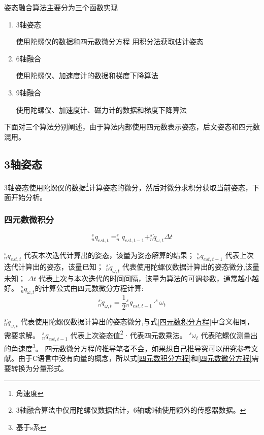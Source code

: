 \documentclass[12pt,a4paper]{article}
\renewcommand{\citet}[1]{\textsuperscript{\cite{#1}}}
\begin{document}
姿态融合算法主要分为三个函数实现
\begin{enumerate}
    \item 3轴姿态

        使用陀螺仪的数据和四元数微分方程 用积分法获取估计姿态
    \item 6轴融合

        使用陀螺仪、加速度计的数据和梯度下降算法
    \item 9轴融合

        使用陀螺仪、加速度计、磁力计的数据和梯度下降算法
\end{enumerate}
下面对三个算法分别阐述，由于算法内部使用四元数表示姿态，后文姿态和四元数混用。

\subsection{3轴姿态}
3轴姿态使用陀螺仪的数据\footnote{角速度}计算姿态的微分，然后对微分求积分获取当前姿态，下面开始分析。
\subsubsection{四元数微积分}
\begin{equation}\label{四元数积分方程}
    ^s_nq_{est,t}=^s_nq_{est,t-1}+^s_n\dot{q}_{\omega,t}\Delta t
\end{equation} 

$^s_nq_{est,t}$          代表本次迭代计算出的姿态，该量为姿态解算的结果；
$^s_nq_{est,t-1}$        代表上次迭代计算出的姿态，该量已知；
$^s_n\dot{q}_{\omega,t}$ 代表使用陀螺仪数据计算出的姿态微分,该量未知；
$\Delta t$               代表上次与本次迭代的时间间隔，该量为算法的可调参数，通常越小越好。
$^s_n\dot{q}_{\omega,t}$的计算公式由四元数微分方程计算:
\begin{equation}\label{四元数微分方程}
    ^s_n\dot{q}_{\omega,t}=\frac{1}{2}{^s_nq_{est,t-1}}\cdot^s\omega_t
\end{equation} 

$^s_n\dot{q}_{\omega,t}$ 代表使用陀螺仪数据计算出的姿态微分,与式\ref{四元数积分方程}中含义相同，需要求解。
$^s_nq_{est,t-1}$  代表上次姿态值\footnote{3轴融合算法中仅用陀螺仪数据估计，6轴或9轴使用额外的传感器数据。}
$\cdot$                  代表四元数乘法。
$^s\omega_t$             代表陀螺仪测量出的角速度\footnote{基于s系}。
四元数微分方程的推导笔者不会，如果想自己推导究可以研究参考文献\citet{四元数微分方程的推导}。由于C语言中没有向量的概念，所以式\ref{四元数积分方程}和\ref{四元数微分方程}需要转换为分量形式。
\end{document}
